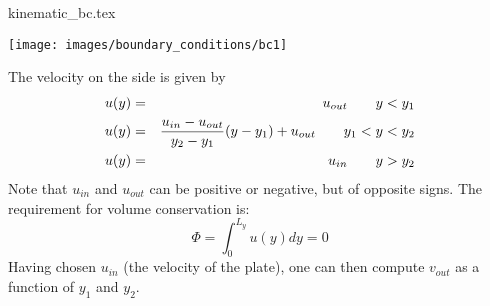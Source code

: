 \begin{flushright} {\tiny {\color{gray} kinematic\_bc.tex}} \end{flushright}


\begin{center}
\texttt{[image: images/boundary\_conditions/bc1]}
\end{center}


\begin{center}
\end{center}



The velocity on the side is given by
\begin{eqnarray}
u(y) &=& u_{out} \quad\quad y<y_1 \nonumber\\
u(y) &=& \frac{u_{in}-u_{out}}{y_2-y_1}(y-y_1) + u_{out} \quad\quad y_1<y<y_2 \nonumber\\
u(y) &=& u_{in} \quad\quad y>y_2 \nonumber
\end{eqnarray}
Note that $u_{in}$ and $u_{out}$ can be positive or negative, but 
of opposite signs.
The requirement for volume conservation is:
\[
\Phi=\int_{0}^{L_y} u(y) dy = 0
\]
Having chosen $u_{in}$ (the velocity of the plate), one can then compute $v_{out}$
as a function of $y_1$ and $y_2$.

